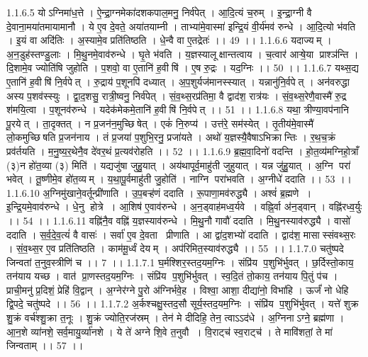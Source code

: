 1.1.6.5
योऽग्निमा॑ध॒त्ते । ऐ॒न्द्रा॒ग्नमेका॑दशकपाल॒मनु॒ निर्व॑पेत् । आ॒दि॒त्यं च॒रुम् । इ॒न्द्रा॒ग्नी वै दे॒वाना॒मया॑तमायामानौ । ये ए॒व दे॒वते॒ अया॑तयाम्नी । ताभ्या॑मे॒वास्मा॑ इन्द्रि॒यं वी॒र्य॑मव॑ रुन्धे । आ॒दि॒त्यो भ॑वति । इ॒यं वा अदि॑तिः । अ॒स्यामे॒व प्रति॑तिष्ठति । धे॒न्वै वा ए॒तद्रेतः॑ ।। 49 ।।
1.1.6.6
यदाज्यम् । अ॒न॒डुह॑स्तण्डु॒लाः । मि॒थु॒नमे॒वाव॑रुन्धे । घृ॒ते भ॑वति । य॒ज्ञस्यालूक्षान्तत्वाय । च॒त्वार॑ आऱ्षे॒या प्राश्ञ॑न्ति । दि॒शामे॒व ज्योति॑षि जुहोति । प॒शवो॒ वा ए॒तानि॑ ह॒वीषि॑ । ए॒ष रु॒द्रः । यद॒ग्निः ।। 50 ।।
1.1.6.7
यथ्स॒द्य ए॒तानि॑ ह॒वीषि॑ नि॒र्वपेत् । रु॒द्राय॑ प॒शूनपि॑ दध्यात् । अ॒प॒शुर्यज॑मानस्स्यात् । यन्नानु॑नि॒र्वपेत् । अन॑वरुद्धा अस्य प॒शव॑स्स्युः । द्वा॒द॒शसु॒ रात्री॒ष्वनु॒ निर्व॑पेत् । सं॒व॒थ्स॒रप्र॑तिमा॒ वै द्वाद॑श॒ रात्र॑यः । सं॒व॒थ्स॒रेणै॒वास्मै॑ रु॒द्र श॑मयि॒त्वा । प॒शूनव॑रुन्धे । यदेक॑मेकमे॒तानि॑ ह॒वीषि॑ नि॒र्वपेत् ।। 51 ।।
1.1.6.8
यथा॒ त्रीण्या॒वप॑नानि पू॒रयेत् । ता॒दृक्तत् । न प्र॒जन॑न॒मुच्छि॑षेत् । एकं॑ नि॒रुप्य॑ । उत्त॑रे॒ सम॑स्येत् । तृ॒तीय॑मे॒वास्मै॑ लो॒कमुच्छि॑षति प्र॒जन॑नाय । तं प्र॒जया॑ प॒शुभि॒रनु॒ प्रजा॑यते । अथो॑ य॒ज्ञस्यै॒वैषाऽभिक्रान्तिः । र॒थ॒च॒क्रं प्रव॑र्तयति । म॒नु॒ष्य॒र॒थेनै॒व दे॑वर॒थं प्र॒त्यव॑रोहति ।। 52 ।।
1.1.6.9
ब्र॒ह्म॒वा॒दिनो॑ वदन्ति । हो॒त॒व्य॑मग्निहो॒त्राँ (३)न हो॑त॒व्या (३) मिति॑ । यद्यजु॑षा जुहु॒यात् । अय॑थापूर्व॒माहु॑ती जुहुयात् । यन्न जु॑हु॒यात् । अ॒ग्नि परा॑ भवेत् । तू॒ष्णीमे॒व हो॑त॒व्यम् । य॒था॒पू॒र्वमाहु॑ती जु॒होति॑ । नाग्नि परा॑भवति । अ॒ग्नीधे॑ ददाति ।। 53 ।।
1.1.6.10
अ॒ग्निमु॑खाने॒वर्तून्प्री॑णाति । उ॒प॒बऱ्ह॑णं ददाति । रू॒पाणा॒मव॑रुद्ध्यै । अश्वं॑ ब्र॒ह्मणे । इ॒न्द्रि॒यमे॒वाव॑रुन्धे । धे॒नु होत्रे । आ॒शिष॑ ए॒वाव॑रुन्धे । अ॒न॒ड्वाह॑मध्व॒र्यवे । वह्नि॒र्वा अ॑न॒ड्वान् । वह्नि॑रध्व॒र्युः ।। 54 ।।
1.1.6.11
वह्नि॑नै॒व वह्नि॑ य॒ज्ञस्याव॑रुन्धे । मि॒थु॒नौ गावौ॑ ददाति । मि॒थु॒नस्याव॑रुद्ध्यै । वासो॑ ददाति । स॒र्व॒दे॒व॒त्यं॑ वै वासः॑ । सर्वा॑ ए॒व दे॒वता प्रीणाति । आ द्वा॑द॒शभ्यो॑ ददाति । द्वाद॑श॒ मासास्संवथ्स॒रः । सं॒व॒थ्स॒र ए॒व प्रति॑तिष्ठति । काम॑मू॒र्ध्वं देयम् । अप॑रिमित॒स्याव॑रुद्ध्यै ।। 55 ।।
1.1.7.0
चतु॑ष्पदे जिन्वतां त॒नुव॒स्त्रीणि॑ च ।। 7 ।।
1.1.7.1
घ॒र्मश्शिर॒स्तद॒यम॒ग्निः । संप्रि॑य प॒शुभि॑र्भुवत् । छ॒र्दिस्तो॒काय॒ तन॑याय यच्छ । वात॑ प्रा॒णस्तद॒यम॒ग्निः । संप्रि॑य प॒शुभि॑र्भुवत् । स्व॒दि॒तं तो॒काय॒ तन॑याय पि॒तुं प॑च । प्राची॒मनु॑ प्र॒दिशं॒ प्रेहि॑ वि॒द्वान् । अ॒ग्नेर॑ग्ने पु॒रो अ॑ग्निर्भवे॒ह । विश्वा॒ आशा॒ दीद्या॑नो॒ विभा॑हि । ऊर्जं॑ नो धेहि द्वि॒पदे॒ चतु॑ष्पदे ।। 56 ।।
1.1.7.2
अ॒र्कश्चक्षु॒स्तद॒सौ सूर्य॒स्तद॒यम॒ग्निः । संप्रि॑य प॒शुभि॑र्भुवत् । यत्ते॑ शुक्र शु॒क्रं वर्च॑श्शु॒क्रा त॒नूः । शु॒क्रं ज्योति॒रज॑स्रम् । तेन॑ मे दीदिहि॒ तेन॒ त्वाऽऽद॑धे । अ॒ग्निनाऽग्ने॒ ब्रह्म॑णा । आ॒न॒शे व्या॑नशे॒ सर्व॒मायु॒र्व्या॑नशे । ये ते॑ अग्ने शि॒वे त॒नुवौ । वि॒राट्च॑ स्व॒राट्च॑ । ते मावि॑शतां॒ ते मा॑ जिन्वताम् ।। 57 ।।
